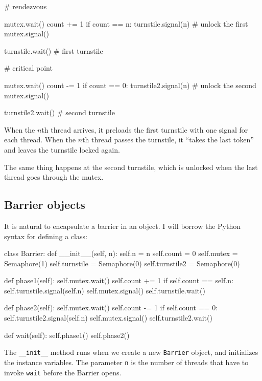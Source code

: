 \documentclass{book}
\begin{document}
\begin{unbreakable}[title={Reusable barrier solution}]{}
# rendezvous

mutex.wait()
 count += 1
 if count == n:
  turnstile.signal(n)  # unlock the first
mutex.signal()

turnstile.wait()       # first turnstile

# critical point

mutex.wait()
 count -= 1
 if count == 0:
  turnstile2.signal(n) # unlock the second
mutex.signal()

turnstile2.wait()      # second turnstile
\end{unbreakable}

When the $n$th thread arrives, it preloads the first turnstile with
one signal for each thread.  When the $n$th thread passes the
turnstile, it ``takes the last token'' and leaves the turnstile locked
again.

The same thing happens at the second turnstile, which is
unlocked when the last thread goes through the mutex.


\subsection {Barrier objects}

It is natural to encapsulate a barrier in an object.  I will
borrow the Python syntax for defining a class:

\begin{unbreakable}[title={Barrier class}]{}
class Barrier:
  def __init__(self, n):
    self.n = n
    self.count = 0
    self.mutex = Semaphore(1)
    self.turnstile = Semaphore(0)
    self.turnstile2 = Semaphore(0)

  def phase1(self):
    self.mutex.wait()
    self.count += 1
    if self.count == self.n:
      self.turnstile.signal(self.n) 
    self.mutex.signal()
    self.turnstile.wait()            

  def phase2(self):
    self.mutex.wait()
    self.count -= 1
    if self.count == 0:
      self.turnstile2.signal(self.n)
    self.mutex.signal()
    self.turnstile2.wait()

  def wait(self):
    self.phase1()
    self.phase2()
\end{unbreakable}

The {\tt \_\_init\_\_} method runs when we create a new
    {\tt Barrier} object, and initializes the instance variables.
The parameter {\tt n} is the number of threads that have
to invoke {\tt wait} before the Barrier opens.
\end{document}
